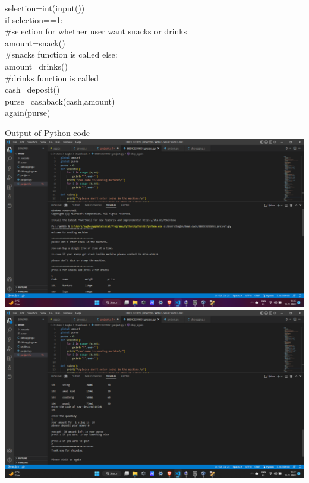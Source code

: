 \documentclass[10pt,a4paper]{article}
\begin{document}
\begin{flushleft}
selection=int(input())\\
if selection==1:\\  \#selection for whether user want snacks or drinks\\
\hspace*{0.5cm}    amount=snack()\\  \#snacks function is called
else:\\
\hspace*{0.5cm}    amount=drinks()\\  \#drinks function is called\\
cash=deposit()\\
purse=cashback(cash,amount)\\
again(purse)\\
\bigskip
\newpage
\begin{center}
Output of Python code\\
\bigskip
\includegraphics[scale=0.3]{python output1}\\
\bigskip
\includegraphics[scale=0.3]{python output2}
\end{center}
\end{flushleft}
\end{document}
